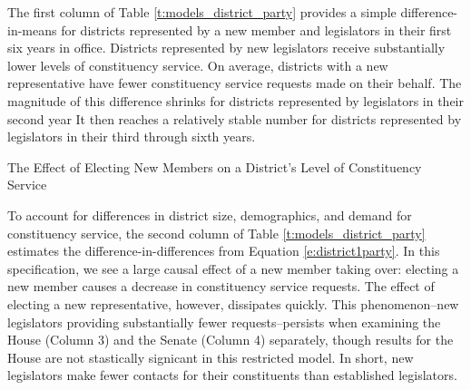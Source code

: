 The first column of Table \ref{t:models_district_party} provides a simple difference-in-means for districts represented by a new member and legislators in their first six years in office. Districts represented by new legislators receive substantially lower levels of constituency service. On average, districts with a new representative have  fewer constituency service requests made on their behalf. The magnitude of this difference shrinks for districts represented by legislators in their second year It then reaches a relatively stable number for districts represented by legislators in their third through sixth years. %



\begin{table}[hbt!]
\caption{The Effect of Electing New Members on a District's Level of Constituency Service} \label{t:models_district_party}
\begin{minipage}{\textwidth}
\begin{center}
\small

\end{center}
\end{minipage}
\end{table}


To account for differences in district size, demographics, and demand for constituency service, the second column of Table \ref{t:models_district_party} estimates the difference-in-differences from Equation \ref{e:district1party}. In this specification, we see a large causal effect of a new member taking over: electing a new member causes a decrease in constituency service requests.
The effect of electing a new representative, however, dissipates quickly. This phenomenon--new legislators providing substantially fewer requests--persists when examining the House (Column 3) and the Senate (Column 4) separately, though results for the House are not stastically signicant in this restricted model. In short, new legislators make fewer contacts for their constituents than established legislators.  

